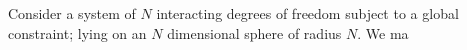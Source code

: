 Consider a system of $N$ interacting degrees of freedom subject to a global constraint; lying on an $N$ dimensional sphere of radius $N$. We ma